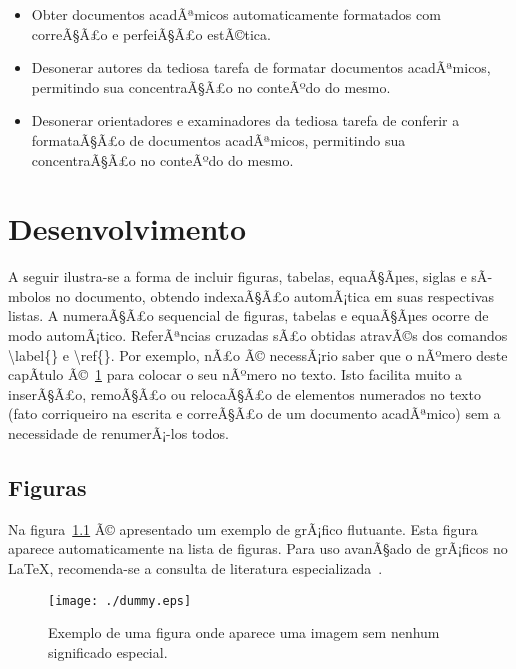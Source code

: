\documentclass[openright]{normas-utf-tex} %
\begin{document}
\begin{itemize}
	\item Obter documentos acadÃªmicos automaticamente formatados com correÃ§Ã£o e perfeiÃ§Ã£o estÃ©tica.
	\item Desonerar autores da tediosa tarefa de formatar documentos acadÃªmicos, permitindo sua concentraÃ§Ã£o no conteÃºdo do mesmo.
	\item Desonerar orientadores e examinadores da tediosa tarefa de conferir a formataÃ§Ã£o de documentos acadÃªmicos, permitindo sua concentraÃ§Ã£o no conteÃºdo do mesmo.
\end{itemize}



\chapter{Desenvolvimento}
\label{chap:desenv}

A seguir ilustra-se a forma de incluir figuras, tabelas, equaÃ§Ãµes, siglas e sÃ­mbolos no documento, obtendo indexaÃ§Ã£o automÃ¡tica em suas respectivas listas. A numeraÃ§Ã£o sequencial de figuras, tabelas e equaÃ§Ãµes ocorre de modo automÃ¡tico. ReferÃªncias cruzadas sÃ£o obtidas atravÃ©s dos comandos {\ttfamily \textbackslash label\{\}} e {\ttfamily \textbackslash ref\{\}}. Por exemplo, nÃ£o Ã© necessÃ¡rio saber que o nÃºmero deste capÃ­tulo Ã©~\ref{chap:desenv} para colocar o seu nÃºmero no texto. Isto facilita muito a inserÃ§Ã£o, remoÃ§Ã£o ou relocaÃ§Ã£o de elementos numerados no texto (fato corriqueiro na escrita e correÃ§Ã£o de um documento acadÃªmico) sem a necessidade de renumerÃ¡-los todos.

\section{Figuras}
\label{sec:figuras}

Na figura~\ref{fig:dummy} Ã© apresentado um exemplo de grÃ¡fico flutuante. Esta figura aparece automaticamente na lista de figuras. Para uso avanÃ§ado de grÃ¡ficos no \LaTeX, recomenda-se a consulta de literatura especializada~\cite{Goossens2007}.

\begin{figure}[!htb]
	\centering
	\caption[Exemplo de uma figura]{Exemplo de uma figura onde aparece uma imagem sem nenhum significado especial.}
	\texttt{[image: ./dummy.eps]} %
	\label{fig:dummy}
\end{figure}
\end{document}
